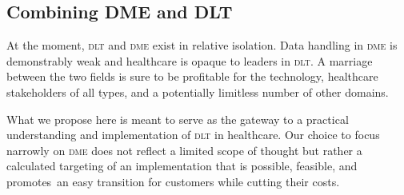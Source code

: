\subsection{Combining DME and DLT}
  At the moment, \textsc{dlt} and \textsc{dme} exist in relative isolation. Data handling in \textsc{dme} is demonstrably weak and healthcare is opaque to leaders in \textsc{dlt}. A marriage between the two fields is sure to be profitable for the technology, healthcare stakeholders of all types, and a potentially limitless number of other domains.%

  What we propose here is meant to serve as the gateway to a practical understanding and implementation of \textsc{dlt} in healthcare. Our choice to focus narrowly on \textsc{dme} does not reflect a limited scope of thought but rather a calculated targeting of an implementation that is possible, feasible, and promotes an easy transition for customers while cutting their costs.%
